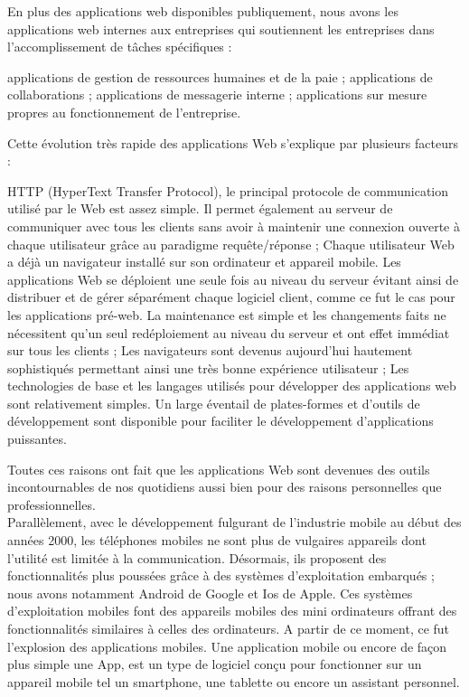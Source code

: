 En plus des applications web disponibles publiquement, nous avons les applications web internes aux entreprises qui soutiennent les entreprises dans l’accomplissement de tâches spécifiques :
\begin{itemize}
	\itemtirait applications de gestion de ressources humaines et de la paie ;
	\itemtirait applications de collaborations ;
	\itemtirait applications de messagerie interne ;
	\itemtirait applications sur mesure propres au fonctionnement de l’entreprise.
\end{itemize}
Cette évolution très rapide des applications Web s'explique par plusieurs facteurs :
\begin{itemize}
	\itemcheck HTTP (HyperText Transfer Protocol), le principal protocole de communication utilisé par le Web est assez simple. Il permet également au serveur de communiquer avec tous les clients sans avoir à maintenir une connexion ouverte à chaque utilisateur grâce au paradigme requête/réponse ;
	\itemcheck Chaque utilisateur Web a déjà un navigateur installé sur son ordinateur et appareil mobile. Les applications Web se déploient une seule fois au niveau du serveur évitant ainsi de distribuer et de gérer séparément chaque logiciel client, comme ce fut le cas pour les applications pré-web. La maintenance est simple et les changements faits ne nécessitent qu'un seul redéploiement au niveau du serveur et ont effet immédiat sur tous les clients ;
	\itemcheck Les navigateurs sont devenus aujourd'hui hautement sophistiqués permettant ainsi une très bonne expérience utilisateur ;
	\itemcheck Les technologies de base et les langages utilisés pour développer des applications web sont relativement simples. Un large éventail de plates-formes et d'outils de développement sont disponible pour faciliter le développement d'applications puissantes.
\end{itemize}
Toutes ces raisons ont fait que les applications Web sont devenues des outils incontournables de nos quotidiens aussi bien pour des raisons personnelles que professionnelles.\\
Parallèlement, avec le développement fulgurant de l'industrie mobile au début des années 2000, les téléphones mobiles ne sont plus de vulgaires appareils dont l'utilité est limitée à la communication. Désormais, ils proposent des fonctionnalités plus poussées grâce à des systèmes d'exploitation embarqués ; nous avons notamment Android de Google et Ios de Apple. Ces systèmes d'exploitation mobiles font des appareils mobiles des mini ordinateurs offrant des fonctionnalités similaires à celles des ordinateurs. A partir de ce moment, ce fut l'explosion des applications mobiles. Une application mobile ou encore de façon plus simple une App, est un type de logiciel conçu pour fonctionner sur un appareil mobile tel un smartphone, une tablette ou encore un assistant personnel. \\
